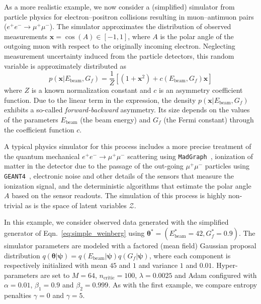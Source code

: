 \documentclass[twocolumn,superscriptaddress,aps]{revtex4-1}
\newcommand{\bftheta}{{\bm \theta}}
\newcommand{\bfpsi}{{\bm \psi}}
\newcommand{\bfz}{\mathbf{z}}
\theoremstyle{plain}
\begin{document}
As a more realistic example, we now consider a (simplified) simulator from
particle physics for electron--positron collisions resulting in muon--antimuon
pairs ($e^+e^- \rightarrow \mu^+\mu^-$). The simulator approximates the
distribution of observed measurements $\mathbf{x} = \cos(A) \in [-1,1]$, where $A$ is the
polar angle of the outgoing muon with respect  to the originally incoming
electron. Neglecting measurement uncertainty induced from the particle detectors,
this random variable is approximately distributed as
\begin{equation}\label{eq:simple_weinberg}
    p(\mathbf{x}|E_\text{beam}, G_f) = \frac{1}{Z} \left[ (1 + \mathbf{x}^2) + c(E_\text{beam}, G_f) \mathbf{x} \right]
\end{equation}
where $Z$ is a known normalization constant and $c$ is an asymmetry coefficient
function. Due to the linear term in the expression, the density $p(\mathbf{x} |
E_\text{beam}, G_f)$ exhibits a so-called {\it forward-backward} asymmetry.  Its
size depends on the values of the parameters $E_\text{beam}$ (the beam energy)
and $G_f$ (the Fermi constant) through the coefficient function $c$.

A typical physics simulator for this process includes a more precise treatment of the
quantum mechanical  $e^+e^- \rightarrow \mu^+\mu^-$ scattering
using \texttt{MadGraph}~\citep{Alwall:2011uj},  ionization of matter in the
detector due to the passage of the out-going $\mu^+\mu^-$ particles using
\texttt{GEANT4}~\citep{Agostinelli:2002hh}, electronic noise and other details of the sensors
that measure the ionization signal, and the deterministic algorithms that
estimate the polar angle $A$ based on the sensor readouts. The simulation of
this process is highly non-trivial as is the space of latent variables $\mathcal{Z}$.



In this example, we consider observed data generated with the simplified generator of Eqn.~\ref{eq:simple_weinberg}
using $\bftheta^* = (E_\text{beam}^*=42, G_f^*=0.9)$. The simulator parameters are modeled with a
factored (mean field) Gaussian proposal distribution $q(\bftheta|\bfpsi) = q(E_\text{beam}|\bfpsi)
q(G_f|\bfpsi)$, where each component is respectively initialized with mean $45$
and $1$ and variance $1$ and $0.01$. Hyper-parameters are set to $M=64$,
$n_\text{critic}=100$, $\lambda=0.0025$ and Adam configured with $\alpha=0.01$,
$\beta_1=0.9$ and $\beta_2=0.999$. As with the first example, we compare
entropy penalties $\gamma=0$ and $\gamma=5$.
\end{document}
